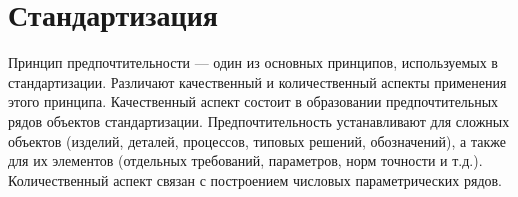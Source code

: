 \section{Стандартизация}

Принцип предпочтительности --- один из основных принципов, используемых в стандартизации. Различают качественный и количественный аспекты применения этого принципа. Качественный аспект состоит в образовании предпочтительных рядов объектов стандартизации. Предпочтительность устанавливают для сложных объектов (изделий, деталей, процессов, типовых решений, обозначений), а также для их элементов (отдельных требований, параметров, норм точности и т.д.). Количественный аспект связан с построением числовых параметрических рядов.

